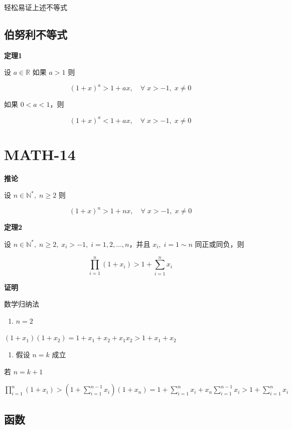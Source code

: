 轻松易证上述不等式

\subsection{伯努利不等式}\label{ux4f2fux52aaux5229ux4e0dux7b49ux5f0f}

\textbf{定理1}

设 \(a\in \mathbb{R}\) 如果 \(a>1\) 则

\[
(1+x)^{a} > 1+ax, \quad \forall \; x> -1, \; x\neq 0
\]

如果 \(0<a<1\)，则

\[
(1+x)^{a}<1+ax, \quad \forall \; x >-1, \; x\neq 0
\]

\section{MATH-14}\label{math-14}

\textbf{推论}

设 \(n\in \mathbb{N}^*, \; n\ge {2}\) 则

\[
(1+x)^{n}>1+nx, \quad \forall\;x>-1, \; x\neq 0
\]

\textbf{定理2}

设
\(n\in \mathbb{N}^{*}, \; n\geq 2, \; x_{i}>-1, \; i=1,2,\dots,n\)，并且
\(x_{i}, \; i=1\sim n\) 同正或同负，则

\[
\prod_{i=1}^{n}(1+x_{i})>1+\sum_{i=1}^{n}x_{i}
\]

\textbf{证明}

数学归纳法

\begin{enumerate}
\def\labelenumi{\arabic{enumi}.}
\tightlist
\item
  \(n=2\)
\end{enumerate}

\((1+x_{1})(1+x_{2})=1+x_{1}+x_{2}+x_{1}x_{2}>1+x_{1}+x_{2}\)

\begin{enumerate}
\def\labelenumi{\arabic{enumi}.}
\setcounter{enumi}{1}
\tightlist
\item
  假设 \(n=k\) 成立
\end{enumerate}

若 \(n=k+1\)

\(\prod_{i=1}^{n} (1+x_{i})>\left( 1+\sum_{i=1}^{n-1}x_{i} \right)(1+x_{n})=1+\sum_{i=1}^{n}x_{i}+x_{n}\sum_{i=1}^{n-1}x_{i}>1+\sum_{i=1}^{n}x_{i}\)

\subsection{函数}\label{ux51fdux6570}

